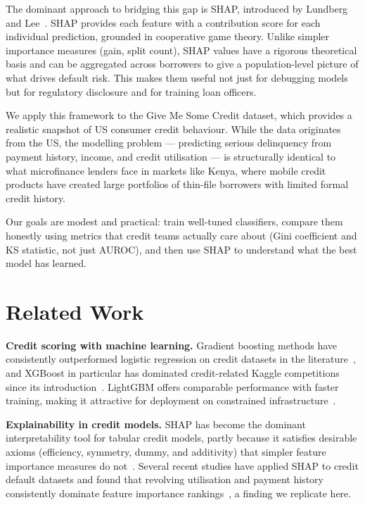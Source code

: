 \documentclass[11pt]{article}
\begin{document}
The dominant approach to bridging this gap is SHAP, introduced by Lundberg and
Lee~\cite{lundberg2017shap}. SHAP provides each feature with a contribution score
for each individual prediction, grounded in cooperative game theory. Unlike simpler
importance measures (gain, split count), SHAP values have a rigorous theoretical
basis and can be aggregated across borrowers to give a population-level picture of
what drives default risk. This makes them useful not just for debugging models but
for regulatory disclosure and for training loan officers.

We apply this framework to the Give Me Some Credit dataset, which provides a realistic
snapshot of US consumer credit behaviour. While the data originates from the US, the
modelling problem --- predicting serious delinquency from payment history,
income, and credit utilisation --- is structurally identical to what microfinance
lenders face in markets like Kenya, where mobile credit products have created large
portfolios of thin-file borrowers with limited formal credit history.

Our goals are modest and practical: train well-tuned classifiers, compare them honestly
using metrics that credit teams actually care about (Gini coefficient and KS statistic,
not just AUROC), and then use SHAP to understand what the best model has learned.

\section{Related Work}

\textbf{Credit scoring with machine learning.} Gradient boosting methods have
consistently outperformed logistic regression on credit datasets in the
literature~\cite{lessmann2015benchmarking}, and XGBoost in particular has dominated
credit-related Kaggle competitions since its
introduction~\cite{chen2016xgboost}. LightGBM offers comparable performance
with faster training, making it attractive for deployment on constrained
infrastructure~\cite{ke2017lightgbm}.

\noindent\textbf{Explainability in credit models.} SHAP has become the dominant
interpretability tool for tabular credit models, partly because it satisfies
desirable axioms (efficiency, symmetry, dummy, and additivity) that simpler
feature importance measures do not~\cite{lundberg2017shap}. Several recent studies
have applied SHAP to credit default datasets and found that revolving
utilisation and payment history consistently dominate feature importance
rankings~\cite{bussmann2021explainability}, a finding we replicate here.
\end{document}
